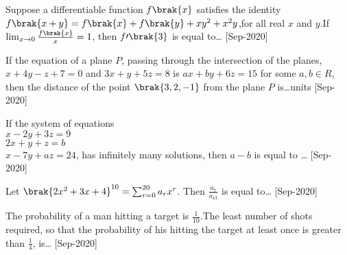 \iffalse
    \title{2020}
    \author{EE24BTECH11021}
    \section{integer}
\fi
  \item Suppose a differentiable function $f\brak{x}$ satisfies the identity $f\brak{x+y}=f\brak{x}+f\brak{y}+xy^2+x^2y$,for all real $x$ and $y$.If $\lim_{x \to 0}\frac{f\brak{x}}{x}=1$, then $f\prime \brak{3}$ is equal to\dots
    \hfill{[Sep-2020]}
    \item If the equation of a plane $P$, passing through the intersection of the planes, $x+4y-z+7=0$ and $3x+y+5z=8$ is $ax+by+6z=15$ for some $a, b\in R$, then the distance of the point $\brak{3,2,-1}$ from the plane $P$ is\dots units
    \hfill{[Sep-2020]}
    \item If the system of equations\\
    $x-2y+3z=9$\\
    $2x+y+z=b$\\
    $x-7y+az=24$, has infinitely many solutions, then $a-b$ is equal to \dots 
    \hfill{[Sep-2020]}
    \item Let $\brak{2x^2+3x+4}^{10}=\sum_{r=0}^{20}a_rx^r$. Then $\frac{a_7}{a_{13}}$ is equal to\dots
    \hfill{[Sep-2020]}
    \item The probability of a man hitting a target is $\frac{1}{10}$.The least number of shots required, so that the probability of his hitting the target at least once is greater than $\frac{1}{4}$, is\dots
    \hfill{[Sep-2020]}
